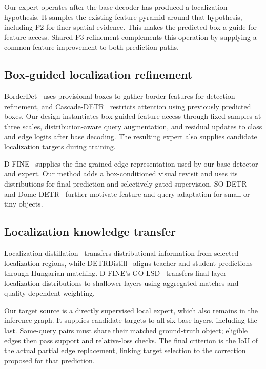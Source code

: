 Our expert operates after the base decoder has produced a localization hypothesis. It samples the existing feature pyramid around that hypothesis, including P2 for finer spatial evidence. This makes the predicted box a guide for feature access. Shared P3 refinement complements this operation by supplying a common feature improvement to both prediction paths.

\subsection{Box-guided localization refinement}
BorderDet~\cite{qiu2020borderdet} uses provisional boxes to gather border features for detection refinement, and Cascade-DETR~\cite{ye2023cascadedetr} restricts attention using previously predicted boxes. Our design instantiates box-guided feature access through fixed samples at three scales, distribution-aware query augmentation, and residual updates to class and edge logits after base decoding. The resulting expert also supplies candidate localization targets during training.

D-FINE~\cite{peng2025dfine} supplies the fine-grained edge representation used by our base detector and expert. Our method adds a box-conditioned visual revisit and uses its distributions for final prediction and selectively gated supervision. SO-DETR~\cite{zhang2025sodetr} and Dome-DETR~\cite{hu2025domedetr} further motivate feature and query adaptation for small or tiny objects.

\subsection{Localization knowledge transfer}
Localization distillation~\cite{zheng2022ld} transfers distributional information from selected localization regions, while DETRDistill~\cite{chang2023detrdistill} aligns teacher and student predictions through Hungarian matching. D-FINE's GO-LSD~\cite{peng2025dfine} transfers final-layer localization distributions to shallower layers using aggregated matches and quality-dependent weighting.

Our target source is a directly supervised local expert, which also remains in the inference graph. It supplies candidate targets to all six base layers, including the last. Same-query pairs must share their matched ground-truth object; eligible edges then pass support and relative-loss checks. The final criterion is the IoU of the actual partial edge replacement, linking target selection to the correction proposed for that prediction.


